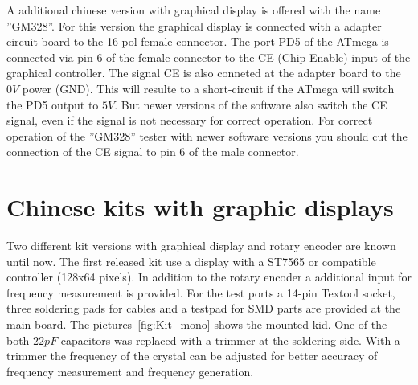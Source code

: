 A additional chinese version with graphical display is offered with the name ''GM328''.
For this version the graphical display is connected with a adapter circuit board to the 16-pol female connector. 
The port PD5 of the ATmega is connected via pin 6 of the female connector to the CE (Chip Enable) input of the 
graphical controller.
The signal CE is also conneted at the adapter board to the \(0V\) power (GND).
This will resulte to a short-circuit if the ATmega will switch the PD5 output to \(5V\).
But newer versions of the software also switch the CE signal, even if the signal is not necessary for
correct operation.
For correct operation of the ''GM328'' tester with newer software versions you should cut the
connection of the CE signal to pin 6 of the male connector.

\section{Chinese kits with graphic displays}

Two different kit versions with graphical display and rotary encoder are known until now.
The first released kit use a display with a ST7565 or compatible controller (128x64 pixels).
In addition to the rotary encoder a additional input for frequency measurement is provided.
For the test ports a 14-pin Textool socket, three soldering pads for cables and a testpad
for SMD parts are provided at the main board.
The pictures~\ref{fig:Kit_mono} shows the mounted kid.
One of the both \(22 pF\) capacitors was replaced with a trimmer at the soldering side.
With a trimmer the frequency of the crystal can be adjusted for better accuracy of frequency measurement
and frequency generation. 

